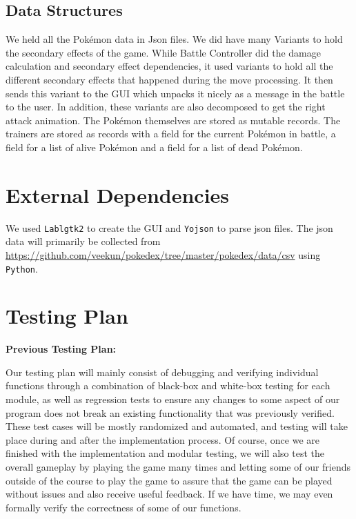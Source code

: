 \documentclass{scrreprt}
\begin{document}
\subsection{Data Structures}
We held all the Pok\'emon data in Json files. We did have many Variants to hold the secondary effects of the game. While Battle Controller did the damage calculation and secondary effect dependencies, it used variants to hold all the different secondary effects that happened during the move processing. It then sends this variant to the GUI which unpacks it nicely as a message in the battle to the user. In addition, these variants are also decomposed to get the right attack animation. The Pok\'emon themselves are stored as mutable records. The trainers are stored as records with a field for the current Pok\'emon in battle, a field for a list of alive Pok\'emon and a field for a list of dead Pok\'emon. 

\section{External Dependencies}
We used  \texttt{Lablgtk2} to create the GUI and \texttt{Yojson} to parse json files. The json data will primarily be collected from \url{https://github.com/veekun/pokedex/tree/master/pokedex/data/csv} using \texttt{Python}.

\section{Testing Plan}

\textbf{Previous Testing Plan:}

Our testing plan will mainly consist of debugging and verifying individual functions through a combination of black-box and white-box testing for each module, as well as regression tests to ensure any changes to some aspect of our program does not break an existing functionality that was previously verified. These test cases will be mostly randomized and automated, and testing will take place during and after the implementation process. Of course, once we are finished with the implementation and modular testing, we will also test the overall gameplay by playing the game many times and letting some of our friends outside of the course to play the game to assure that the game can be played without issues and also receive useful feedback. If we have time, we may even formally verify the correctness of some of our functions.
\end{document}
